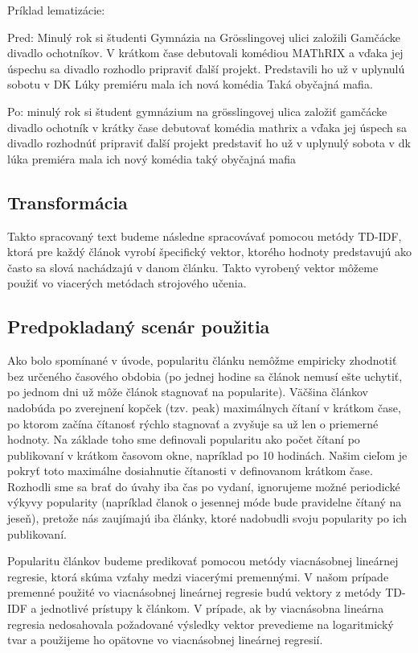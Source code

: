 \documentclass[runningheads,a4paper]{llncs}
\begin{document}
Príklad lematizácie:

Pred:
Minulý rok si študenti Gymnázia na Grösslingovej ulici založili Gamčácke divadlo ochotníkov. V krátkom čase debutovali komédiou MAThRIX a vďaka jej úspechu sa divadlo rozhodlo pripraviť ďalší projekt. Predstavili ho už v uplynulú sobotu v DK Lúky premiéru mala ich nová komédia Taká obyčajná mafia.

Po:
minulý rok si študent gymnázium na grösslingovej ulica založiť gamčácke divadlo ochotník v krátky čase debutovať komédia mathrix a vďaka jej úspech sa divadlo rozhodnúť pripraviť ďalší projekt predstaviť ho už v uplynulý sobota v dk lúka premiéra mala ich nový komédia taký obyčajná mafia

\subsection{Transformácia}
Takto spracovaný text budeme následne spracovávať pomocou metódy TD-IDF, ktorá pre každý článok vyrobí špecifický vektor, ktorého hodnoty predstavujú ako často sa slová nachádzajú v danom článku. Takto vyrobený vektor môžeme použiť vo viacerých metódach strojového učenia.

\subsection{Predpokladaný scenár použitia}
Ako bolo spomínané v úvode, popularitu článku nemôžme empiricky zhodnotiť bez určeného časového obdobia (po jednej hodine sa článok nemusí ešte uchytiť, po jednom dni už môže článok stagnovať na popularite). Väčšina článkov nadobúda po zverejnení kopček (tzv. peak) maximálnych čítaní v krátkom čase, po ktorom začína čítanosť rýchlo stagnovať a zvyšuje sa už len o priemerné hodnoty. Na základe toho sme definovali popularitu ako počet čítaní po publikovaní v krátkom časovom okne, napríklad po 10 hodinách. Našim cieľom je pokryť toto maximálne dosiahnutie čítanosti v definovanom krátkom čase. Rozhodli sme sa brať do úvahy iba čas po vydaní, ignorujeme možné periodické výkyvy popularity (napríklad članok o jesennej móde bude pravidelne čítaný na jeseň), pretože nás zaujímajú iba články, ktoré nadobudli svoju popularity po ich publikovaní.

Popularitu článkov budeme predikovať pomocou metódy viacnásobnej lineárnej regresie, ktorá skúma vzťahy medzi viacerými premennými. V našom prípade premenné použité vo viacnásobnej lineárnej regresie budú vektory z metódy TD-IDF a jednotlivé prístupy k článkom. V prípade, ak by viacnásobna lineárna regresia nedosahovala požadované výsledky vektor prevedieme na logaritmický tvar a použijeme ho opätovne vo viacnásobnej lineárnej regresií. 
\end{document}

